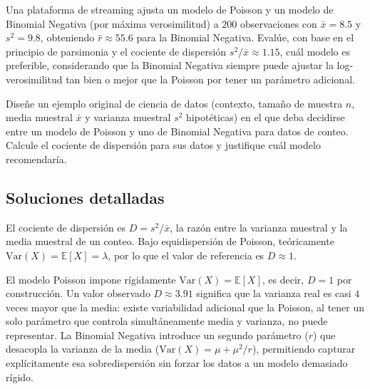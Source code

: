 \begin{problema}
	\label{prob:395bc31}
	Una plataforma de streaming ajusta un modelo de Poisson y un modelo de Binomial Negativa (por máxima verosimilitud) a $200$ observaciones con $\bar{x}=8.5$ y $s^2=9.8$, obteniendo $\hat{r}\approx55.6$ para la Binomial Negativa. Evalúe, con base en el principio de parsimonia y el cociente de dispersión $s^2/\bar{x}\approx1.15$, cuál modelo es preferible, considerando que la Binomial Negativa siempre puede ajustar la log-verosimilitud tan bien o mejor que la Poisson por tener un parámetro adicional.
\end{problema}

\begin{problema}
	\label{prob:a28b8e6}
	Diseñe un ejemplo original de ciencia de datos (contexto, tamaño de muestra $n$, media muestral $\bar{x}$ y varianza muestral $s^2$ hipotéticas) en el que deba decidirse entre un modelo de Poisson y uno de Binomial Negativa para datos de conteo. Calcule el cociente de dispersión para sus datos y justifique cuál modelo recomendaría.
\end{problema}

\subsection*{Soluciones detalladas}

\begin{solproblema}[prob:9b48fd0]
	El cociente de dispersión es $D = s^2/\bar{x}$, la razón entre la varianza muestral y la media muestral de un conteo. Bajo equidispersión de Poisson, teóricamente $\text{Var}(X)=\mathbb{E}[X]=\lambda$, por lo que el valor de referencia es $D\approx1$.
\end{solproblema}

\begin{solproblema}[prob:65ac238]
	El modelo Poisson impone rígidamente $\text{Var}(X)=\mathbb{E}[X]$, es decir, $D=1$ por construcción. Un valor observado $D\approx3.91$ significa que la varianza real es casi $4$ veces mayor que la media: existe variabilidad adicional que la Poisson, al tener un solo parámetro que controla simultáneamente media y varianza, no puede representar. La Binomial Negativa introduce un segundo parámetro ($r$) que desacopla la varianza de la media ($\text{Var}(X)=\mu+\mu^2/r$), permitiendo capturar explícitamente esa sobredispersión sin forzar los datos a un modelo demasiado rígido.
\end{solproblema}

